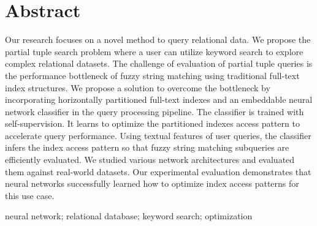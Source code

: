 \chapter*{Abstract}

Our research focuses on a novel method to query relational data. We propose the partial tuple search problem where a user can utilize keyword search to explore complex relational datasets. The challenge of evaluation of partial tuple queries is the performance bottleneck of fuzzy string matching using traditional full-text index structures. We propose a solution to overcome the bottleneck by incorporating horizontally partitioned full-text indexes and an embeddable neural network classifier in the query processing pipeline. The classifier is trained with self-supervision. It learns to optimize the partitioned indexes access pattern to accelerate query performance. Using textual features of user queries, the classifier infers the index access pattern so that fuzzy string matching subqueries are efficiently evaluated. We studied various network architectures and evaluated them against real-world datasets. Our experimental evaluation demonstrates that neural networks successfully learned how to optimize index access patterns for this use case.
\newline

 neural network; relational database; keyword search; optimization
